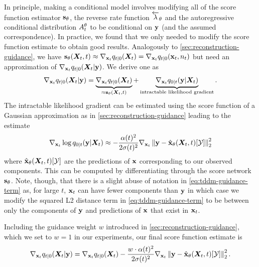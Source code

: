 In principle, making a conditional model involves modifying all of the score function estimator ${\mathbf{s}}_\theta$, the reverse rate function $\overleftarrow{\lambda}_\theta$ and the autoregressive conditional distribution $A_t^\theta$ to be conditional on ${\mathbf{y}}$ (and the assumed correspondence). In practice, we found that we only needed to modify the score function estimate to obtain good results. Analogously to \cref{sec:reconstruction-guidance}, we have ${\mathbf{s}}_\theta({\bm{X}}_t, t) \approx \nabla_{{\mathbf{x}}_t} q_{t|0} ({\bm{X}}_t) = \nabla_{{\mathbf{x}}_t} q_{t|0} ({\mathbf{x}}_t, n_t)$ but need an approximation of $\nabla_{{\mathbf{x}}_t} q_{t|0} ({\bm{X}}_t | {\mathbf{y}} )$. We derive one as
\begin{align}
    \nabla_{{\mathbf{x}}_t} q_{t|0} ({\bm{X}}_t | {\mathbf{y}} ) = \underbrace{\nabla_{{\mathbf{x}}_t} q_{t|0} ({\bm{X}}_t)}_{\approx {\mathbf{s}}_\theta({\bm{X}}_t, t)} + \underbrace{\nabla_{{\mathbf{x}}_t} q_{0|t} ({\mathbf{y}} | {\bm{X}}_t)}_\text{intractable likelihood gradient}.
\end{align}
The intractable likelihood gradient can be estimated using the score function of a Gaussian approximation as in \cref{sec:reconstruction-guidance} leading to the estimate
\begin{equation} \label{eq:tddm-guidance-term}
    \nabla_{{\mathbf{x}}_t} \log q_{0|t}({\mathbf{y}} | {\bm{X}}_t) \approx - \frac{\alpha(t)^2}{2\sigma(t)^2} \nabla_{{\mathbf{x}}_t} \left\lVert{\mathbf{y}} - \hat{{\mathbf{x}}}_\theta({\bm{X}}_t, t)[{\mathcal{Y}}] \right\rVert^2_2
\end{equation}
where $\hat{{\mathbf{x}}}_\theta({\bm{X}}_t, t)[{\mathcal{Y}}]$ are the predictions of ${\mathbf{x}}$ corresponding to our observed components. This can be computed by differentiating through the score network ${\mathbf{s}}_\theta$.  Note, though, that there is a slight abuse of notation in \cref{eq:tddm-guidance-term} as, for large $t$, ${\mathbf{x}}_t$ can have fewer components than ${\mathbf{y}}$ in which case we modify the squared L2 distance term in \cref{eq:tddm-guidance-term} to be between only the components of ${\mathbf{y}}$ and predictions of ${\mathbf{x}}$ that exist in ${\mathbf{x}}_t$.

Including the guidance weight $w$ introduced in \cref{sec:reconstruction-guidance}, which we set to $w = 1$ in our experiments, our final score function estimate is
\begin{equation} \label{eq:tddm-guidance-score}
    \nabla_{{\mathbf{x}}_t} q_{t|0} ({\bm{X}}_t | {\mathbf{y}} ) = \nabla_{{\mathbf{x}}_t} q_{t|0} ({\bm{X}}_t) - \frac{w \cdot \alpha(t)^2}{2\sigma(t)^2} \nabla_{{\mathbf{x}}_t} \left\lVert{\mathbf{y}} - \hat{{\mathbf{x}}}_\theta({\bm{X}}_t, t)[{\mathcal{Y}}] \right\rVert^2_2.
\end{equation}

